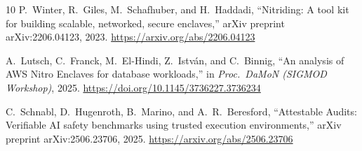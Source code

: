 \documentclass[11pt,a4paper]{article}
\begin{document}
\begin{thebibliography}{10}
P.~Winter, R.~Giles, M.~Schafhuber, and H.~Haddadi,
``Nitriding: A tool kit for building scalable, networked, secure enclaves,''
arXiv preprint arXiv:2206.04123, 2023.
\url{https://arxiv.org/abs/2206.04123}

A.~Lutsch, C.~Franck, M.~El-Hindi, Z.~Istv\'an, and C.~Binnig,
``An analysis of AWS Nitro Enclaves for database workloads,''
in \emph{Proc.\ DaMoN (SIGMOD Workshop)}, 2025.
\url{https://doi.org/10.1145/3736227.3736234}

C.~Schnabl, D.~Hugenroth, B.~Marino, and A.~R.~Beresford,
``Attestable Audits: Verifiable AI safety benchmarks using trusted execution environments,''
arXiv preprint arXiv:2506.23706, 2025.
\url{https://arxiv.org/abs/2506.23706}

\end{thebibliography}
\end{document}
